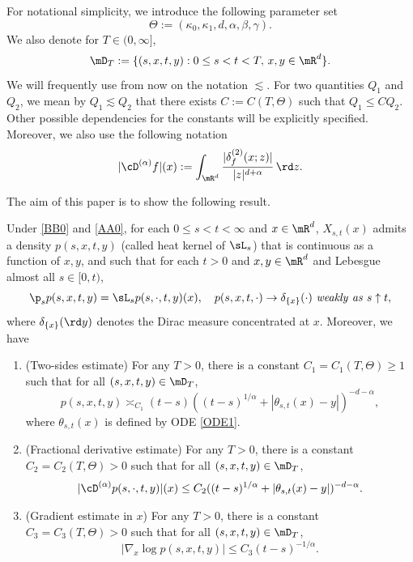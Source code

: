 For notational simplicity, we introduce the following parameter set
\begin{equation}\label{DEF_THETA}
\Theta:=(\kappa_0,\kappa_1,d,\alpha,\beta,\gamma).
\end{equation}
We also denote for $T\in(0,\infty]$,
\[
\mD_T:=\{(s,x,t,y): 0\leq s<t<T,\, x,y\in\mR^d\}.
\]
We will frequently use from now on the notation $\lesssim$. For two quantities $Q_1$ and $Q_2$, we mean by
$Q_1\lesssim Q_2 $ that there exists $C:=C(T,\Theta)$ such that $Q_1\le CQ_2 $. Other possible dependencies for the constants will be explicitly specified.
Moreover, we also use the following notation
\begin{equation}\label{DA0}
|\cD^{(\alpha)} f|(x):=\int_{\mR^d}\frac{|\delta^{(2)}_f(x;z)|}{|z|^{d+\alpha}}\,\rd z.
\end{equation}

The aim of this paper is to show the following result.
\begin{theorem}\label{Main}
Under \eqref{BB0} and \eqref{AA0}, for each $0\leq s<t<\infty$ and $x\in\mR^d$, $X_{s,t}(x)$ admits a density $p(s,x,t,y)$
(called heat kernel of $\sL_{s}$) that is continuous as a function of $x,y$, and such that for each $t>0$ and $x,y\in\mR^d$ and Lebesgue almost all $s\in[0,t)$,
\[
\p_s p(s,x,t,y)=\sL_{s}p(s,\cdot,t,y)(x),\quad p(s,x,t,\cdot)\rightarrow \delta_{\{x\}}(\cdot)\ {\rm \it weakly\ as}\ s\uparrow t,
\]
where $\delta_{\{x\}}(\rd y)$ denotes the Dirac measure concentrated at $x$.
Moreover, we have
\begin{enumerate}
\item (Two-sides estimate) For any $T>0$, there is a constant $C_1=C_1(T,\Theta)\ge 1$ such that for all $(s,x,t,y)\in\mD_T$,
\begin{equation}\label{TW}
p(s,x,t,y)\asymp_{C_1} (t-s)((t-s)^{1/\alpha}+|\theta_{s,t}(x)-y|)^{-d-\alpha},
\end{equation}
where $\theta_{s,t}(x)$ is defined by ODE \eqref{ODE1}.
\item (Fractional derivative estimate) For any $T>0$, there is a constant $C_2=C_2(T,\Theta)>0$ such that for all $(s,x,t,y)\in\mD_T$,
\begin{equation*}%
|\cD^{(\alpha)}p(s,\cdot,t,y)|(x) \le {C_2} ((t-s)^{1/\alpha}+|\theta_{s,t}(x)-y|)^{-d-\alpha}.
\end{equation*}
\item (Gradient estimate in $x$) For any $T>0$, there is a constant $C_3=C_3(T,\Theta)>0$ such that for all $(s,x,t,y)\in\mD_T$,
\begin{equation}\label{GR0}
|\nabla_x\log p(s,x,t,y)|\le {C_3} (t-s)^{-1/\alpha}.
\end{equation}
\end{enumerate}
\end{theorem}

